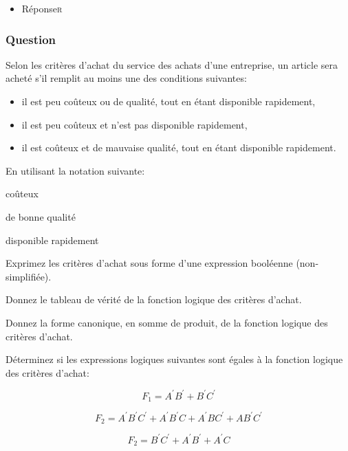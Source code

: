 \documentclass[11pt]{article}
\begin{document}
\begin{itemize}
\item Réponse\hfill{}\textsc{r}
\label{sec:org9926d6e}
\end{itemize}

\subsubsection*{Question}
\label{sec:orgcef0e5c}
Selon les critères d'achat du service des achats d'une entreprise, un
  article sera acheté s'il remplit au moins une des conditions
  suivantes:

\begin{itemize}
\item il est peu coûteux ou de qualité, tout en étant disponible
rapidement,

\item il est peu coûteux et n'est pas disponible rapidement,

\item il est coûteux et de mauvaise qualité, tout en étant disponible
rapidement.
\end{itemize}

En utilisant la notation suivante:

\begin{description}
\item[{A}] coûteux

\item[{B}] de bonne qualité

\item[{C}] disponible rapidement

\item Exprimez les critères d'achat sous forme d'une expression
booléenne (non-simplifiée).

\item Donnez le tableau de vérité de la fonction logique des critères
d'achat.

\item Donnez la forme canonique, en somme de produit, de la fonction
logique des critères d'achat.

\item Déterminez si les expressions logiques suivantes sont égales à la
fonction logique des critères d'achat:

$$F_1 = A^{\prime} B^{\prime} + B^{\prime} C^{\prime}$$

$$F_2 = A^{\prime} B^{\prime} C^{\prime} + A^{\prime} B^{\prime} C + A^{\prime} B C^{\prime} + A B^{\prime} C^{\prime}$$

$$F_2 = B^{\prime} C^{\prime} + A^{\prime} B^{\prime} + A^{\prime} C$$
\end{description}
\end{document}
